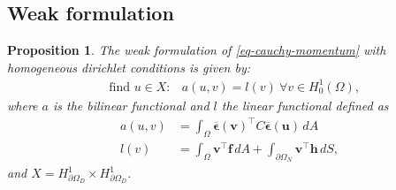 \documentclass[5pt,a4paper,english]{elsarticle}%
\newtheorem{proposition}[theorem]{Proposition}
\begin{document}
\subsection{Weak formulation}
\begin{proposition}
    The weak formulation of \eqref{eq-cauchy-momentum} with homogeneous dirichlet conditions is given by:  
    \begin{equation*}
        \begin{aligned}
        &\text{find } u \in X : 
        &a(u,v) = l(v) \ \forall v \in H_0^{1}(\Omega), 
        \label{weak_formulation_elastic}
        \end{aligned}
    \end{equation*}
    where $a$ is the bilinear functional and $l$ the linear functional defined as 
    \begin{equation*}
        \begin{aligned}
            a(u,v) &= \int_{\Omega} \boldsymbol{\overline \epsilon}(\boldsymbol v)^\intercal C\boldsymbol{\overline \epsilon}(\boldsymbol u)  \, dA
            \\
            l(v) &= \int_\Omega{\boldsymbol{v}^\intercal \boldsymbol{f}} \,dA  + \int_{\partial \Omega_N}{\boldsymbol{v}^\intercal \boldsymbol h} \,dS,
        \end{aligned}
    \end{equation*}
    and $ X=   H^1_{\partial \Omega_D } \times H^1_{\partial \Omega_D } $.
\end{proposition}
\end{document}
